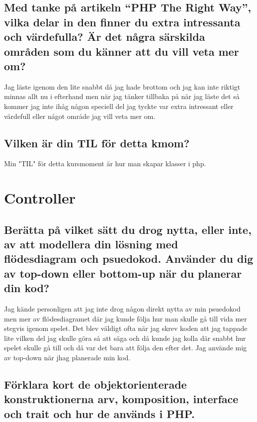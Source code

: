 \documentclass[oneside]{book}
\begin{document}
\section{Med tanke på artikeln “PHP The Right Way”,
vilka delar in den finner du extra intressanta och
värdefulla? Är det några särskilda områden som du känner att du vill veta mer om?}

Jag läste igenom den lite snabbt då jag hade brottom och jag kan inte riktigt minnas
allt nu i efterhand men när jag tänker tillbaka på när jag läste det så kommer jag
inte ihåg någon speciell del jag tyckte var extra intressant eller värdefull eller
något område jag vill veta mer om.

\section{Vilken är din TIL för detta kmom?}

Min "TIL" för detta kursmoment är hur man skapar klasser i php.

\section{}



\chapter{Controller}

\section{Berätta på vilket sätt du drog nytta, eller inte, av att modellera din
lösning med flödesdiagram och psuedokod.
Använder du dig av top-down eller bottom-up när du planerar din kod?}

Jag kände personligen att jag inte drog någon direkt nytta av min psuedokod men mer av flödesdiagramet
där jag kunde följa hur man skulle gå till vida mer stegvis igenom spelet. Det blev väldigt ofta när jag skrev koden
att jag tappade lite vilken del jag skulle göra så att säga och då kunde jag kolla där snabbt hur spelet skulle gå till
och då var det bara att följa den efter det. Jag använde mig av top-down när jhag planerade min kod.

\section{Förklara kort de objektorienterade konstruktionerna arv, komposition, interface och trait och hur de används i PHP.}
\end{document}
